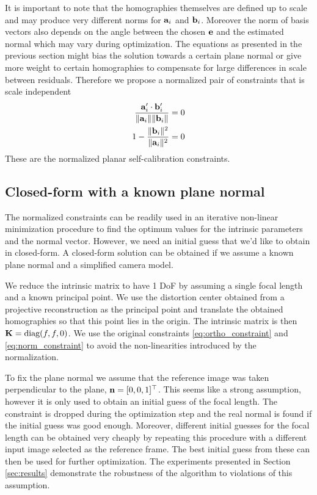 \documentclass[10pt,twocolumn,letterpaper]{article}
\begin{document}
It is important to note that the homographies themselves are defined up to scale and may produce very different norms for $\mathbf{a}_i$ and $\mathbf{b}_i$. Moreover the norm of basis vectors also depends on the angle between the chosen $\mathbf{e}$ and the estimated normal which may vary during optimization. The equations as presented in the previous section might bias the solution towards a certain plane normal or give more weight to certain homographies to compensate for large differences in scale between residuals. Therefore we propose a normalized pair of constraints that is scale independent 
\begin{align}
\frac{\mathbf{a}_i' \cdot \mathbf{b}_i'}{\lVert\mathbf{a}_i\rVert \lVert\mathbf{b}_i\rVert} = 0 \label{eq:ortho_constraint_normalized}\\
1 - \frac{\lVert\mathbf{b}_i\rVert^2}{\lVert\mathbf{a}_i\rVert^2} = 0 \label{eq:norm_constraint_normalized}
\end{align}
These are the normalized planar self-calibration constraints.

\subsection{Closed-form with a known plane normal}
\label{sec:calib:closed}

The normalized constraints can be readily used in an iterative non-linear minimization procedure to find the optimum values for the intrinsic parameters and the normal vector. However, we need an initial guess that we'd like to obtain in closed-form. A closed-form solution can be obtained if we assume a known plane normal and a simplified camera model. 

We reduce the intrinsic matrix to have 1 DoF by assuming a single focal length and a known principal point. We use the distortion center obtained from a projective reconstruction as the principal point and translate the obtained homographies so that this point lies in the origin. The intrinsic matrix is then $\mathbf{K}=\text{diag}(f, f, 0)$. We use the original constraints \eqref{eq:ortho_constraint} and \eqref{eq:norm_constraint} to avoid the non-linearities introduced by the normalization.

To fix the plane normal we assume that the reference image was taken perpendicular to the plane, \ie $\mathbf{n}=[0,0,1]^\top$. This seems like a strong assumption, however it is only used to obtain an initial guess of the focal length. The constraint is dropped during the optimization step and the real normal is found if the initial guess was good enough. Moreover, different initial guesses for the focal length can be obtained very cheaply by repeating this procedure with a different input image selected as the reference frame. The best initial guess from these can then be used for further optimization. The experiments presented in Section \ref{sec:results} demonstrate the robustness of the algorithm to violations of this assumption.
\end{document}
